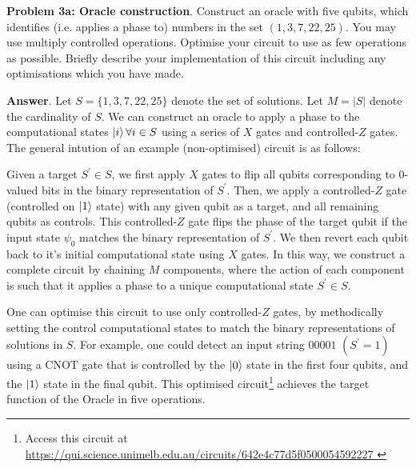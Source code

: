 \textbf{Problem 3a: Oracle construction}. Construct an oracle with five qubits, which identifies (i.e. applies a phase to) numbers in the set $(1, 3, 7, 22, 25)$. 
You may use multiply controlled operations.
Optimise your circuit to use as few operations as possible. 
Briefly describe your implementation of this circuit including any optimisations which you have made.


\textbf{Answer}. Let $S = \{1, 3, 7, 22, 25\}$ denote the set of solutions. 
Let $M=|S|$ denote the cardinality of $S$.
We can construct an oracle to apply a phase to the computational states $\ket{i} \forall i \in S$ using a series of $X$ gates and controlled-$Z$ gates. The general intution of an example (non-optimised) circuit is as follows: 

Given a target $S^\prime \in S$, we first apply $X$ gates to flip all qubits corresponding to $0$-valued bits in the binary representation of $S^\prime$. 
Then, we apply a controlled-$Z$ gate (controlled on $\ket{1}$ state) with any given qubit as a target, and all remaining qubits as controls.
This controlled-$Z$ gate flips the phase of the target qubit if the input state $\psi_0$ matches the binary representation of $S^\prime$.
We then revert each qubit back to it's initial computational state using $X$ gates.
In this way, we construct a complete circuit by chaining $M$ components, where the action of each component is such that it applies a phase to a unique computational state $S^\prime \in S$.

One can optimise this circuit to use only controlled-$Z$ gates, by methodically setting the control computational states to match the binary representations of solutions in $S$.
For example, one could detect an input string $00001$ $(S^\prime=1)$ using a CNOT gate that is controlled by the $\ket{0}$ state in the first four qubits, and the $\ket{1}$ state in the final qubit.
This optimised circuit\footnote{Access this circuit at \url{https://qui.science.unimelb.edu.au/circuits/642e4c77d5f0500054592227
}} achieves the target function of the Oracle in five operations.

